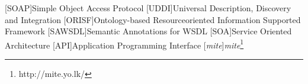 
[SOAP]{Simple Object Access Protocol}
[UDDI]{Universal Description, Discovery and Integration}
[ORISF]{Ontology-based Resourceoriented Information Supported Framework}
[SAWSDL]{Semantic Annotations for WSDL}
[SOA]{Service Oriented Architecture}
[API]{Application Programming Interface}
[\emph{mite}]{\emph{mite}\footnote{http://mite.yo.lk/}}